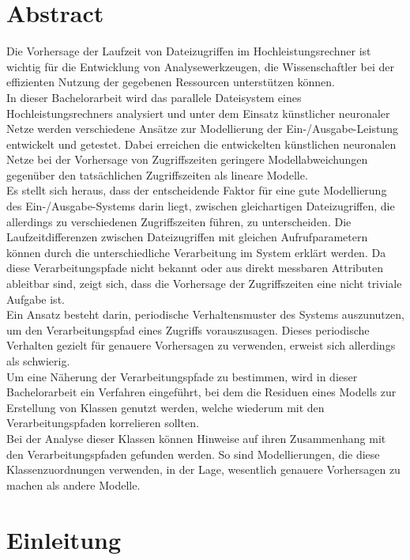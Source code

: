 \documentclass[
	twoside,
	12pt,
	a4paper,
	BCOR10mm,
	DIV14,
	listof=totoc,
	bibliography=totoc,
	headsepline
]{scrreprt}
\begin{document}
\chapter*{Abstract}
Die Vorhersage der Laufzeit von Dateizugriffen im Hochleistungsrechner ist wichtig für die Entwicklung von Analysewerkzeugen, die Wissenschaftler bei der effizienten Nutzung der gegebenen Ressourcen unterstützen können.\\
In dieser Bachelorarbeit wird das parallele Dateisystem eines Hochleistungsrechners analysiert und unter dem Einsatz künstlicher neuronaler Netze werden verschiedene Ansätze zur Modellierung der Ein-/Ausgabe-Leistung entwickelt und getestet.
Dabei erreichen die entwickelten künstlichen neuronalen Netze bei der Vorhersage von Zugriffszeiten geringere Modellabweichungen gegenüber den tatsächlichen Zugriffszeiten als lineare Modelle.\\
Es stellt sich heraus, dass der entscheidende Faktor für eine gute Modellierung des Ein-/Ausgabe-Systems darin liegt, zwischen gleichartigen Dateizugriffen, die allerdings zu verschiedenen Zugriffszeiten führen, zu unterscheiden.
Die Laufzeitdifferenzen zwischen Dateizugriffen mit gleichen Aufrufparametern können durch die unterschiedliche Verarbeitung im System erklärt werden.
Da diese Verarbeitungspfade nicht bekannt oder aus direkt messbaren Attributen ableitbar sind, zeigt sich, dass die Vorhersage der Zugriffszeiten eine nicht triviale Aufgabe ist.\\
Ein Ansatz besteht darin, periodische Verhaltensmuster des Systems auszunutzen, um den Verarbeitungspfad eines Zugriffs vorauszusagen. Dieses periodische Verhalten gezielt für genauere Vorhersagen zu verwenden, erweist sich allerdings als schwierig.\\
Um eine Näherung der Verarbeitungspfade zu bestimmen, wird in dieser Bachelorarbeit ein Verfahren eingeführt, bei dem die Residuen eines Modells zur Erstellung von Klassen genutzt werden, welche wiederum mit den Verarbeitungspfaden korrelieren sollten.\\
Bei der Analyse dieser Klassen können Hinweise auf ihren Zusammenhang mit den Verarbeitungspfaden gefunden werden.
So sind Modellierungen, die diese Klassenzuordnungen verwenden, in der Lage, wesentlich genauere Vorhersagen zu machen als andere Modelle. 
\thispagestyle{empty}


\tableofcontents

\chapter{Einleitung}
\label{Einleitung}
\end{document}
